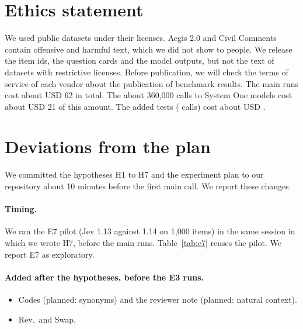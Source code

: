 \documentclass[11pt]{article}
\begin{document}
\section*{Ethics statement}

We used public datasets under their licenses. Aegis 2.0 and Civil Comments contain offensive and harmful text, which we did not show to people. We release the item ids, the question cards and the model outputs, but not the text of datasets with restrictive licenses. Before publication, we will check the terms of service of each vendor about the publication of benchmark results. The main runs cost about USD 62 in total. The about 360,000 calls to System One models cost about USD 21 of this amount. The added tests (\addedCalls{} calls) cost about USD \addedCost.



\appendix

\section{Deviations from the plan}
\label{app:deviations}

We committed the hypotheses H1 to H7 and the experiment plan to our repository about 10 minutes before the first main call. We report these changes.

\paragraph{Timing.} We ran the E7 pilot (Jev 1.13 against 1.14 on 1,000 items) in the same session in which we wrote H7, before the main runs. Table~\ref{tab:e7} reuses the pilot. We report E7 as exploratory.

\paragraph{Added after the hypotheses, before the E3 runs.}
\begin{itemize}
\setlength\itemsep{0pt}
\item Codes (planned: synonyms) and the reviewer note (planned: natural context).
\item Rev.\ and Swap.
\end{itemize}
\end{document}
